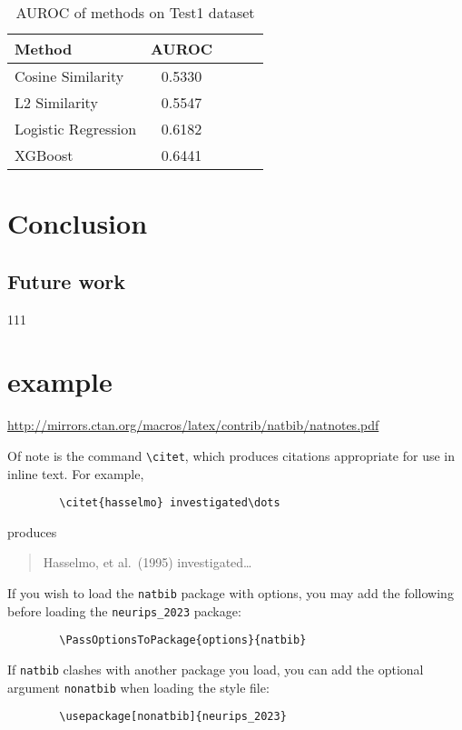 \documentclass{article}
\begin{document}
\begin{table}[h]
\caption{AUROC of methods on Test1 dataset}
\label{tab:results}
\centering
\begin{tabular}{lcccc}
\toprule
\textbf{Method} & \textbf{AUROC}\\
\midrule
Cosine Similarity & 0.5330\\
L2 Similarity & 0.5547\\
Logistic Regression & 0.6182\\
XGBoost & 0.6441\\
\bottomrule
\end{tabular}
\end{table}

	\section{Conclusion}
	\subsection{Future work}
111
	
\section{example}
	\begin{center}
		\url{http://mirrors.ctan.org/macros/latex/contrib/natbib/natnotes.pdf}
	\end{center}
	Of note is the command \verb+\citet+, which produces citations appropriate for
	use in inline text.  For example,
	\begin{verbatim}
		\citet{hasselmo} investigated\dots
	\end{verbatim}
	produces
	\begin{quote}
		Hasselmo, et al.\ (1995) investigated\dots
	\end{quote}
	
	
	If you wish to load the \verb+natbib+ package with options, you may add the
	following before loading the \verb+neurips_2023+ package:
	\begin{verbatim}
		\PassOptionsToPackage{options}{natbib}
	\end{verbatim}
	
	
	If \verb+natbib+ clashes with another package you load, you can add the optional
	argument \verb+nonatbib+ when loading the style file:
	\begin{verbatim}
		\usepackage[nonatbib]{neurips_2023}
	\end{verbatim}
	
\end{document}
